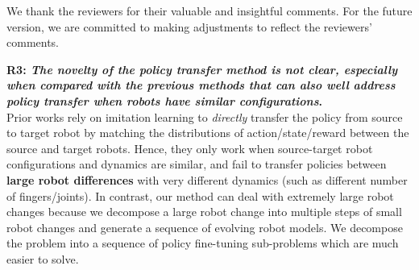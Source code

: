 \documentclass[nohyperref]{article}
\theoremstyle{plain}
\theoremstyle{definition}
\theoremstyle{remark}
\begin{document}

We thank the reviewers for their valuable and insightful comments. 
For the future version, we are committed to making adjustments to reflect the reviewers' comments.



\textbf{\textcolor{viz_blue}{R3}: \textit{The novelty of the policy transfer method is not clear, especially when compared with the previous methods that can also well address policy transfer when robots have similar configurations}. } \\
Prior works rely on imitation learning to \textit{directly} transfer the policy from source to target robot by matching the distributions of  action/state/reward between the source and target robots. Hence, they only work when source-target robot configurations and dynamics are similar, and fail to transfer policies between \textcolor{viz_red}{\textbf{large robot differences}} with very different dynamics (such as different number of fingers/joints).
In contrast, our method can deal with extremely large robot changes because we decompose a large robot change into multiple steps of small robot changes and generate a sequence of evolving robot models. We decompose the problem into a sequence of policy fine-tuning sub-problems which are much easier to solve. 
\end{document}
